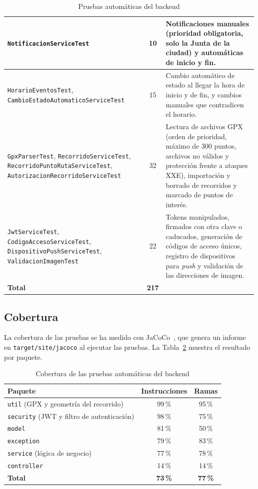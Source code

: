 \begin{table}[H]
\begin{tabular}{|p{4.6cm}|c|p{8.4cm}|}
\hline
\texttt{NotificacionServiceTest} & 10 & Notificaciones manuales (prioridad obligatoria, solo la Junta de la ciudad) y automáticas de inicio y fin. \\
\hline
\texttt{HorarioEventosTest}, \texttt{CambioEstadoAutomaticoServiceTest} & 15 & Cambio automático de estado al llegar la hora de inicio y de fin, y cambios manuales que contradicen el horario. \\
\hline
\texttt{GpxParserTest}, \texttt{RecorridoServiceTest}, \texttt{RecorridoPuntoRutaServiceTest}, \texttt{AutorizacionRecorridoServiceTest} & 32 & Lectura de archivos GPX (orden de prioridad, máximo de 300 puntos, archivos no válidos y protección frente a ataques XXE), importación y borrado de recorridos y marcado de puntos de interés. \\
\hline
\texttt{JwtServiceTest}, \texttt{CodigoAccesoServiceTest}, \texttt{DispositivoPushServiceTest}, \texttt{ValidacionImagenTest} & 22 & Tokens manipulados, firmados con otra clave o caducados, generación de códigos de acceso únicos, registro de dispositivos para \emph{push} y validación de las direcciones de imagen. \\
\hline
\textbf{Total} & \textbf{217} & \\
\hline
\end{tabular}
\caption{Pruebas automáticas del backend}
\label{tab:pruebasBackend}
\end{table}

\subsection{Cobertura}

La cobertura de las pruebas se ha medido con JaCoCo~\cite{jacoco}, que genera un informe en \texttt{target/site/jacoco} al ejecutar las pruebas. La Tabla~\ref{tab:cobertura} muestra el resultado por paquete.

\begin{table}[H]
\centering
\renewcommand{\arraystretch}{1.2}
\begin{tabular}{|l|c|c|}
\hline
\textbf{Paquete} & \textbf{Instrucciones} & \textbf{Ramas} \\
\hline
\texttt{util} (GPX y geometría del recorrido) & 99\,\% & 95\,\% \\
\hline
\texttt{security} (JWT y filtro de autenticación) & 98\,\% & 75\,\% \\
\hline
\texttt{model} & 81\,\% & 50\,\% \\
\hline
\texttt{exception} & 79\,\% & 83\,\% \\
\hline
\texttt{service} (lógica de negocio) & 77\,\% & 78\,\% \\
\hline
\texttt{controller} & 14\,\% & 14\,\% \\
\hline
\textbf{Total} & \textbf{73\,\%} & \textbf{77\,\%} \\
\hline
\end{tabular}
\caption{Cobertura de las pruebas automáticas del backend}
\label{tab:cobertura}
\end{table}

